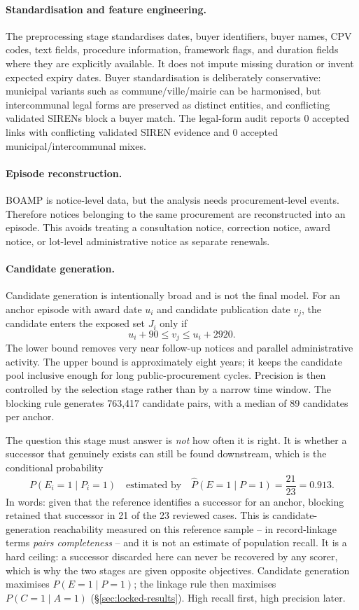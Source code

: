 \documentclass[11pt,a4paper]{article}
\begin{document}
\paragraph{Standardisation and feature engineering.}
The preprocessing stage standardises dates, buyer identifiers, buyer names, CPV
codes, text fields, procedure information, framework flags, and duration fields
where they are explicitly available. It does not impute missing duration or
invent expected expiry dates. Buyer standardisation is deliberately conservative:
municipal variants such as commune/ville/mairie can be harmonised, but
intercommunal legal forms are preserved as distinct entities, and conflicting
validated SIRENs block a buyer match. The legal-form audit reports
0 accepted links with
conflicting validated SIREN evidence and 0
accepted municipal/intercommunal mixes.

\paragraph{Episode reconstruction.}
BOAMP is notice-level data, but the analysis needs procurement-level events.
Therefore notices belonging to the same procurement are reconstructed into an
episode. This avoids treating a consultation notice, correction notice, award
notice, or lot-level administrative notice as separate renewals.

\paragraph{Candidate generation.}
Candidate generation is intentionally broad and is not the final model. For an
anchor episode with award date \(u_i\) and candidate publication date \(v_j\),
the candidate enters the exposed set \(J_i\) only if
\[
u_i+90 \leq v_j \leq u_i+2920 .
\]
The lower bound removes very near follow-up notices and parallel administrative
activity. The upper bound is approximately eight years; it keeps the candidate
pool inclusive enough for long public-procurement cycles. Precision is then
controlled by the selection stage rather than by a narrow time window. The
blocking rule generates 763,417 candidate
pairs, with a median of 89
candidates per anchor.

The question this stage must answer is \emph{not} how often it is right. It is
whether a successor that genuinely exists can still be found downstream, which
is the conditional probability
\[
P(E_i=1 \mid P_i=1)
\quad\text{estimated by}\quad
\hat{P}(E=1\mid P=1)=\frac{21}{23}=0.913 .
\]
In words: given that the reference identifies a successor for an anchor,
blocking retained that successor in
21 of the
23 reviewed cases. This is candidate-generation
reachability measured on this reference sample -- in record-linkage terms
\emph{pairs completeness} -- and it is not an estimate of population recall.
It is a hard ceiling: a successor discarded here can never be recovered by any
scorer, which is why the two stages are given opposite objectives. Candidate
generation maximises \(P(E=1\mid P=1)\); the linkage rule then maximises
\(P(C=1\mid A=1)\) (\S\ref{sec:locked-results}). High recall first, high
precision later.
\end{document}

